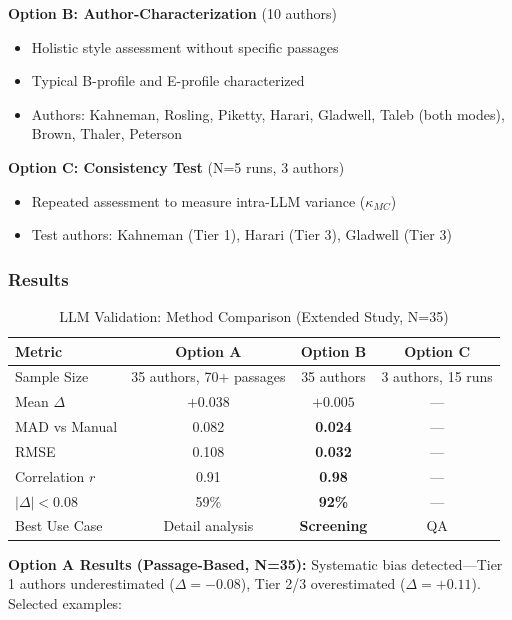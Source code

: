 \documentclass[11pt,a4paper]{article}
\begin{document}
\textbf{Option B: Author-Characterization} (10 authors)
\begin{itemize}
    \item Holistic style assessment without specific passages
    \item Typical B-profile and E-profile characterized
    \item Authors: Kahneman, Rosling, Piketty, Harari, Gladwell, Taleb (both modes), Brown, Thaler, Peterson
\end{itemize}

\textbf{Option C: Consistency Test} (N=5 runs, 3 authors)
\begin{itemize}
    \item Repeated assessment to measure intra-LLM variance ($\kappa_{MC}$)
    \item Test authors: Kahneman (Tier 1), Harari (Tier 3), Gladwell (Tier 3)
\end{itemize}

\subsubsection{Results}

\begin{table}[h]
\centering
\caption{LLM Validation: Method Comparison (Extended Study, N=35)}
\begin{tabular}{lccc}
\toprule
\textbf{Metric} & \textbf{Option A} & \textbf{Option B} & \textbf{Option C} \\
\midrule
Sample Size & 35 authors, 70+ passages & 35 authors & 3 authors, 15 runs \\
Mean $\Delta$ & $+0.038$ & $+0.005$ & --- \\
MAD vs Manual & 0.082 & \textbf{0.024} & --- \\
RMSE & 0.108 & \textbf{0.032} & --- \\
Correlation $r$ & 0.91 & \textbf{0.98} & --- \\
$|\Delta| < 0.08$ & 59\% & \textbf{92\%} & --- \\
Best Use Case & Detail analysis & \textbf{Screening} & QA \\
\bottomrule
\end{tabular}
\end{table}

\textbf{Option A Results (Passage-Based, N=35):} Systematic bias detected---Tier 1 authors underestimated ($\Delta = -0.08$), Tier 2/3 overestimated ($\Delta = +0.11$). Selected examples:
\end{document}
